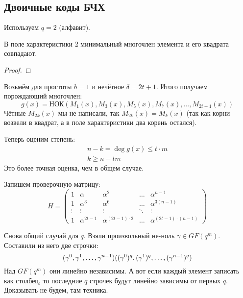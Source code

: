 \subsection{Двоичные коды БЧХ}

Используем $q=2$ (алфавит).
\begin{lemma}
	В поле характеристики 2 минимальный многочлен элемента
	и его квадрата совпадают.
\end{lemma}
\begin{proof}
	\TODO
\end{proof}

Возьмём для простоты $b=1$ и нечётное $\delta=2t+1$.
Итого получаем порождающий многочлен:
\[
g(x) = НОК(M_1(x), M_3(x), M_5(x), M_7(x), \dots, M_{2t-1}(x))
\]
Чётные $M_{2k}(x)$ мы не написали, так $M_{2k}(x)=M_k(x)$ (так как
корни возвели в квадрат, а в поле характеристики два корень остался).

Теперь оценим степень:
\begin{gather*}
n - k = \deg g(x) \le t \cdot m \\
k \ge n - tm
\end{gather*}
Это более точная оценка, чем в общем случае.

Запишем проверочную матрицу:
\[
H = \begin{pmatrix}
1 & \alpha & \alpha^2 & \dots & \alpha^{n-1} \\
1 & \alpha^3 & \alpha^6 & \dots & \alpha^{3(n-1)} \\
\vdots & \vdots & \vdots & \ddots & \vdots \\
1 & \alpha^{2t-1} & \alpha^{(2t-1)\cdot2} & \dots & \alpha^{(2t-1)\cdot(n-1)}
\end{pmatrix}
\]

\begin{lemma}
Снова общий случай для $q$.
Взяли произвольный не-ноль $\gamma \in GF(q^m)$.
Составили из него две строчки:
\[
(\gamma^0, \gamma^1, \dots, \gamma^{n-1}) \\
((\gamma^0)^q, (\gamma^1)^q, \dots, (\gamma^{n-1})^q)
\]
Над $GF(q^m)$ они линейно независимы.
А вот если каждый элемент записать как столбец,
то последние $q$ строчек будут линейно зависимы от первых $q$.
Доказывать не будем, там техника.
\end{lemma}

